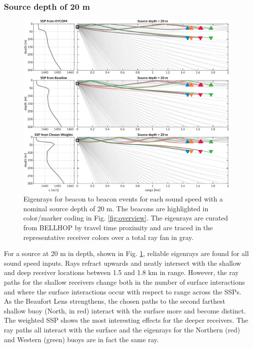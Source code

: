 \subsubsection{Source depth of 20 m}
\begin{figure}[ht!]
  \centering
  \includegraphics[width=\reprintcolumnwidth]{figs/raytrace-3env-zs-20.pdf}
  \caption{Eigenrays for beacon to beacon events for each sound speed with a nominal source depth of 20 m. The beacons are highlighted in color/marker coding in Fig. \ref{fig:overview}. The eigenrays are curated from BELLHOP by travel time proximity and are traced in the representative receiver colors over a total ray fan in gray.}
  \label{fig:raytrace-zs20}
\end{figure}

For a source at 20 m in depth, shown in Fig. \ref{fig:raytrace-zs20}, reliable eigenrays are found for all sound speed inputs.
Rays refract upwards and neatly intersect with the shallow and deep receiver locations between 1.5 and 1.8 km in range.
However, the ray paths for the shallow receivers change both in the number of surface interactions and where the surface interactions occur with respect to range across the SSPs.
As the Beaufort Lens strengthens, the chosen paths to the second farthest shallow buoy (North, in red) interact with the surface more and become distinct.
The weighted SSP shows the most interesting effects for the deeper receivers.
The ray paths all interact with the surface and the eigenrays for the Northern (red) and Western (green) buoys are in fact the same ray.

